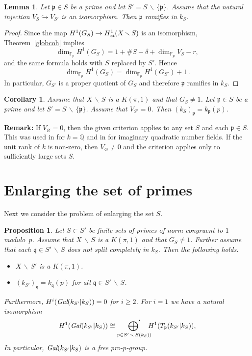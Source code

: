 \documentclass[10pt]{article}
\newcommand{\Q}{{\mathbb Q}}
\newcommand{\F}{{\mathbb F}}
\newcommand{\p}{{\mathfrak p}}
\newcommand{\q}{{\mathfrak q}}
\newcommand{\sm}{{\,\smallsetminus\,}}
\newcommand{\et}{\text{\it et}}
\newcommand{\Gal}{\text{\it Gal}}
\newcommand{\ressum}{\mathop{\hbox{${\displaystyle\bigoplus}'$}}\limits}
\theoremstyle{alex}
\newtheorem{corollary}[theorem]{Corollary}
\newtheorem{lemma}[theorem]{Lemma}
\newtheorem{proposition}[theorem]{Proposition}
\theoremstyle{alexdef}
\begin{document}
\begin{lemma} \label{whenramifies} Let $\p \in S$ be a prime and let $S'=S\sm \{\p\}$. Assume that the natural injection $V_{S} \hookrightarrow V_{S'}$ is an isomorphism. Then $\p$ ramifies in $k_S$.
\end{lemma}

\begin{proof}
Since the map $H^1(G_S)\to H^1_\et(X\sm S)$ is an isomorphism,  Theorem~\ref{globcoh} implies
\[
\dim_{\F_p}H^1(G_S)= 1 + \# S - \delta + \dim_{\F_p} V_S - r,
\]
and the same formula holds with $S$ replaced by $S'$. Hence
\[
\dim_{\F_p}H^1(G_S) = \dim_{\F_p}H^1(G_{S'}) +1\,.
\]
In particular, $G_{S'}$ is a proper quotient of $G_S$ and therefore $\p$ ramifies in $k_S$.
\end{proof}

\begin{corollary}
Assume that $X\sm S$ is a $K(\pi,1)$  and that $G_S\neq 1$. Let $\p \in S$ be a prime and let $S'=S\sm \{\p\}$. Assume that $V_{S'}=0$. Then $(k_S)_\p=k_\p(p)$.
\end{corollary}


\noindent
{\bf Remark:} If $V_\varnothing =0$, then the given criterion applies to any set $S$ and each $\p \in S$. This was used in \cite{S} for $k=\Q$ and in \cite{Vo} for imaginary quadratic number fields. If the unit rank of $k$ is non-zero, then $V_\varnothing\neq 0$ and the criterion applies only to sufficiently large sets $S$.


\section{Enlarging the set of primes}
Next we consider the problem of enlarging the set $S$.

\begin{proposition} \label{enlarge}
Let $S\subset S'$ be finite sets of primes of norm congruent to $1$ modulo~$p$.  Assume that $X\sm S$ is a $K(\pi,1)$ and that $G_S\neq 1$. Further assume that each $\q\in S'\sm S$ does not split completely in $k_S$. Then the following holds.

\begin{itemize}
\item[\rm (i)] $X\sm S'$ is a $K(\pi,1)$.
\item[\rm (ii)] $(k_{S'})_\q=k_\q(p)$ for all $\q \in S'\sm S$.
\end{itemize}
Furthermore,
$
H^i(\Gal(k_{S'}|k_S))=0
$
for $i\geq 2$. For $i=1$ we have a natural isomorphism
\[
H^1(\Gal(k_{S'}|k_S)) \cong \ressum_{{\mathfrak p} \in S'\sm S (k_S))} \!\!\!\! H^1(T_{\mathfrak p}(k_{S'}|k_S)),
\]
In particular, $\Gal(k_{S'}|k_S)$ is a free pro-$p$-group.
\end{proposition}
\end{document}
